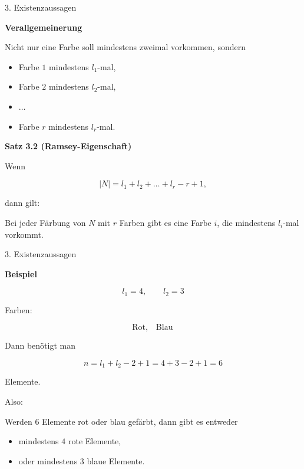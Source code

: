 \documentclass{beamer}
\begin{document}
\begin{frame}{3. Existenzaussagen}

\textbf{Verallgemeinerung}

\medskip

Nicht nur eine Farbe soll mindestens zweimal vorkommen, sondern

\begin{itemize}
    \item Farbe \(1\) mindestens \(l_1\)-mal,
    \item Farbe \(2\) mindestens \(l_2\)-mal,
    \item \(\dots\)
    \item Farbe \(r\) mindestens \(l_r\)-mal.
\end{itemize}

\medskip

\textbf{Satz 3.2 (Ramsey-Eigenschaft)}

Wenn

\[
|N|
=
l_1+l_2+\dots+l_r-r+1,
\]

dann gilt:

Bei jeder Färbung von \(N\) mit \(r\) Farben gibt es eine Farbe \(i\),
die mindestens \(l_i\)-mal vorkommt.

\end{frame}

\begin{frame}{3. Existenzaussagen}

\textbf{Beispiel}

\[
l_1=4,\qquad l_2=3
\]

Farben:

\[
\text{Rot},\quad \text{Blau}
\]

Dann benötigt man

\[
n=l_1+l_2-2+1
=4+3-2+1
=6
\]

Elemente.

\medskip

Also:

Werden \(6\) Elemente rot oder blau gefärbt,
dann gibt es entweder

\begin{itemize}
    \item mindestens \(4\) rote Elemente,
    \item oder mindestens \(3\) blaue Elemente.
\end{itemize}

\end{frame}
\end{document}
